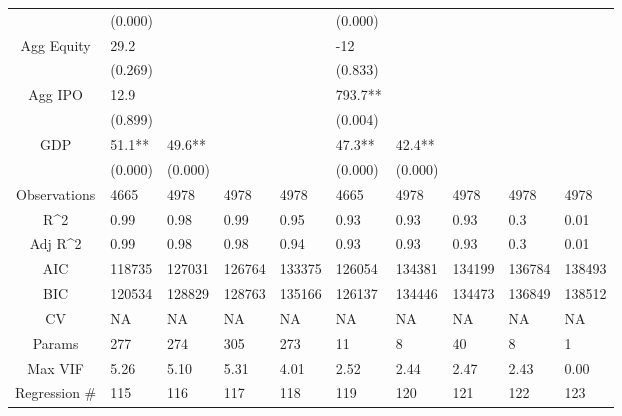 \documentclass{article}
\begin{document}
\begin{table}[H]
\begin{tabular}{|clllllllll|}
   & (0.000) &  &  &  & (0.000) &  &  &  &  \\ 
  Agg Equity & 29.2 &  &  &  & -12 &  &  &  &  \\ 
   & (0.269) &  &  &  & (0.833) &  &  &  &  \\ 
  Agg IPO & 12.9 &  &  &  & 793.7** &  &  &  &  \\ 
   & (0.899) &  &  &  & (0.004) &  &  &  &  \\ 
  GDP & 51.1** & 49.6** &  &  & 47.3** & 42.4** &  &  &  \\ 
   & (0.000) & (0.000) &  &  & (0.000) & (0.000) &  &  &  \\ 
  \hline 
 Observations & 4665 & 4978 & 4978 & 4978 & 4665 & 4978 & 4978 & 4978 & 4978 \\ 
  R^2 & 0.99 & 0.98 & 0.99 & 0.95 & 0.93 & 0.93 & 0.93 & 0.3 & 0.01 \\ 
  Adj R^2 & 0.99 & 0.98 & 0.98 & 0.94 & 0.93 & 0.93 & 0.93 & 0.3 & 0.01 \\ 
  AIC & 118735 & 127031 & 126764 & 133375 & 126054 & 134381 & 134199 & 136784 & 138493 \\ 
  BIC & 120534 & 128829 & 128763 & 135166 & 126137 & 134446 & 134473 & 136849 & 138512 \\ 
  CV & NA & NA & NA & NA & NA & NA & NA & NA & NA \\ 
  Params & 277 & 274 & 305 & 273 & 11 & 8 & 40 & 8 & 1 \\ 
  Max VIF & 5.26 & 5.10 & 5.31 & 4.01 & 2.52 & 2.44 & 2.47 & 2.43 & 0.00 \\ 
  Regression \# & 115 & 116 & 117 & 118 & 119 & 120 & 121 & 122 & 123 \\ 
   \hline
\end{tabular}
 
\end{table}
\end{document}
